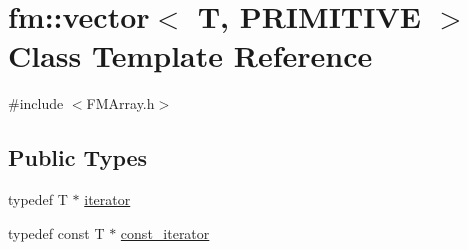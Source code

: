 \hypertarget{classfm_1_1vector}{
\section{fm::vector$<$ T, PRIMITIVE $>$ Class Template Reference}
\label{classfm_1_1vector}
}


{\ttfamily \#include $<$FMArray.h$>$}

\subsection*{Public Types}
\begin{DoxyCompactItemize}
\item 
typedef T $\ast$ \hyperlink{classfm_1_1vector_a45a46984d2c34a4b3a21a8f8532fa213}{iterator}
\item 
typedef const T $\ast$ \hyperlink{classfm_1_1vector_aa012e8933574a62a4cc52e186a917722}{const\_\-iterator}
\end{DoxyCompactItemize}
